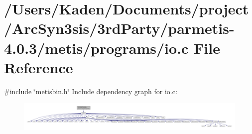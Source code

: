 \hypertarget{a00858}{}\section{/\+Users/\+Kaden/\+Documents/project/\+Arc\+Syn3sis/3rd\+Party/parmetis-\/4.0.3/metis/programs/io.c File Reference}
\label{a00858}
{\ttfamily \#include \char`\"{}metisbin.\+h\char`\"{}}\newline
Include dependency graph for io.\+c\+:\nopagebreak
\begin{figure}[H]
\begin{center}
\leavevmode
\includegraphics[width=350pt]{a00859}
\end{center}
\end{figure}
